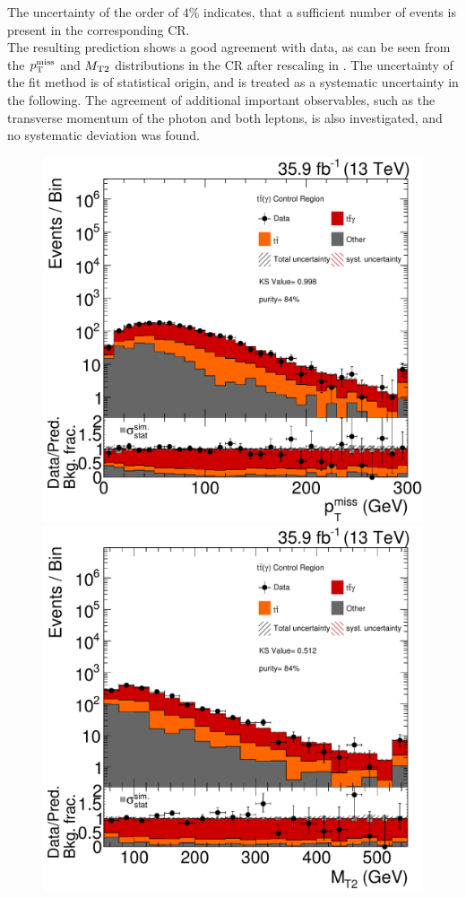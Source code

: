 The uncertainty of the order of $4\%$ indicates, that a sufficient number of events is present in the corresponding CR.\\
The resulting prediction shows a good agreement with data, as can be seen from the $p_{\mathrm{T}}^\text{miss}$ and $M_{\mathrm{T2}}$ distributions in the CR after rescaling in . The uncertainty of the fit method is of statistical origin, and is treated as a systematic uncertainty in the following. The agreement of additional important observables, such as the transverse momentum of the photon and both leptons, is also investigated, and no systematic deviation was found.
\begin{figure}[tbp]
 \centering
 \includegraphics[width=\pairwidth]{figures/plots_CR_tt/CRTT_EM_nom_met_log2}
 \includegraphics[width=\pairwidth]{figures/plots_CR_tt/CRTT_EM_nom_mt2_log2}

\end{figure}
